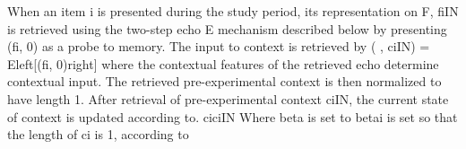 {}When an item \markdownRendererDollarSign{}i\markdownRendererDollarSign{} is presented during the study period, its representation on \markdownRendererDollarSign{}F\markdownRendererDollarSign{}, \markdownRendererDollarSign{}f\markdownRendererLeftBrace{}i\markdownRendererRightBrace{}\markdownRendererCircumflex{}\markdownRendererLeftBrace{}IN\markdownRendererRightBrace{}\markdownRendererDollarSign{} is retrieved using the two-step echo \markdownRendererDollarSign{}E\markdownRendererDollarSign{} mechanism described below by presenting \markdownRendererDollarSign{}(f\markdownRendererUnderscore{}i, 0)\markdownRendererDollarSign{} as a probe to memory. The input to context is retrieved by\markdownRendererInterblockSeparator
{}\markdownRendererDollarSign{}\markdownRendererDollarSign{}(\markdownRendererUnderscore{} , c\markdownRendererUnderscore{}\markdownRendererLeftBrace{}i\markdownRendererRightBrace{}\markdownRendererCircumflex{}\markdownRendererLeftBrace{}IN\markdownRendererRightBrace{}) = E\markdownRendererBackslash{}left[(f\markdownRendererUnderscore{}i, 0)\markdownRendererBackslash{}right]\markdownRendererDollarSign{}\markdownRendererDollarSign{}\markdownRendererInterblockSeparator
{}where the contextual features of the retrieved echo determine contextual input. The retrieved pre-experimental context is then normalized to have length 1.\markdownRendererInterblockSeparator
{}After retrieval of pre-experimental context \markdownRendererDollarSign{}c\markdownRendererUnderscore{}\markdownRendererLeftBrace{}i\markdownRendererRightBrace{}\markdownRendererCircumflex{}\markdownRendererLeftBrace{}IN\markdownRendererRightBrace{}\markdownRendererDollarSign{}, the current state of context is updated according to.\markdownRendererInterblockSeparator
{}\markdownRendererDollarSign{}\markdownRendererDollarSign{}cic\markdownRendererLeftBrace{}i\markdownRendererRightBrace{}\markdownRendererCircumflex{}\markdownRendererLeftBrace{}IN\markdownRendererRightBrace{}\markdownRendererDollarSign{}\markdownRendererDollarSign{}\markdownRendererInterblockSeparator
{}Where \markdownRendererDollarSign{}\markdownRendererBackslash{}beta\markdownRendererDollarSign{} is set to \markdownRendererDollarSign{}\markdownRendererBackslash{}betai\markdownRendererDollarSign{} is set so that the length of \markdownRendererDollarSign{}c\markdownRendererUnderscore{}i\markdownRendererDollarSign{} is 1, according to\markdownRendererInterblockSeparator
